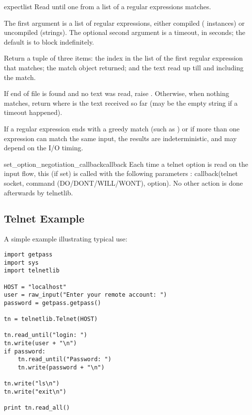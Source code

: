 \begin{methoddesc}{expect}{list}
Read until one from a list of a regular expressions matches.

The first argument is a list of regular expressions, either
compiled ( instances) or uncompiled (strings).
The optional second argument is a timeout, in seconds; the default
is to block indefinitely.

Return a tuple of three items: the index in the list of the
first regular expression that matches; the match object
returned; and the text read up till and including the match.

If end of file is found and no text was read, raise
.  Otherwise, when nothing matches, return
 where  is the text received so
far (may be the empty string if a timeout happened).

If a regular expression ends with a greedy match (such as )
or if more than one expression can match the same input, the
results are indeterministic, and may depend on the I/O timing.
\end{methoddesc}

\begin{methoddesc}{set_option_negotiation_callback}{callback}
Each time a telnet option is read on the input flow, this
 (if set) is called with the following parameters :
callback(telnet socket, command (DO/DONT/WILL/WONT), option).  No other
action is done afterwards by telnetlib.
\end{methoddesc}


\subsection{Telnet Example \label{telnet-example}}

A simple example illustrating typical use:

\begin{verbatim}
import getpass
import sys
import telnetlib

HOST = "localhost"
user = raw_input("Enter your remote account: ")
password = getpass.getpass()

tn = telnetlib.Telnet(HOST)

tn.read_until("login: ")
tn.write(user + "\n")
if password:
    tn.read_until("Password: ")
    tn.write(password + "\n")

tn.write("ls\n")
tn.write("exit\n")

print tn.read_all()
\end{verbatim}
